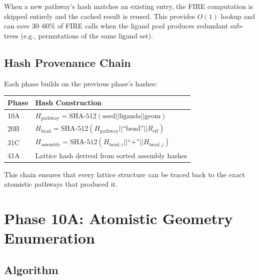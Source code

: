 \documentclass[11pt,a4paper]{article}
\begin{document}
When a new pathway's hash matches an existing entry, the FIRE
computation is skipped entirely and the cached result is reused.
This provides $O(1)$ lookup and can save 30--60\% of FIRE calls
when the ligand pool produces redundant sub-trees (e.g., permutations
of the same ligand set).

\subsection{Hash Provenance Chain}

Each phase builds on the previous phase's hashes:

\begin{center}
\begin{tabular}{lp{9cm}}
\toprule
\textbf{Phase} & \textbf{Hash Construction} \\
\midrule
10A & $H_\text{pathway} = \text{SHA-512}(\text{seed} || \text{ligands} || \text{geom})$ \\
20B & $H_\text{bead} = \text{SHA-512}(H_\text{pathway} || \text{``bead''} || R_\text{eff})$ \\
31C & $H_\text{assembly} = \text{SHA-512}(H_{\text{bead},i} || \text{``+''} || H_{\text{bead},j})$ \\
41A & Lattice hash derived from sorted assembly hashes \\
\bottomrule
\end{tabular}
\end{center}

\noindent This chain ensures that every lattice structure can be traced
back to the exact atomistic pathways that produced it.

\section{Phase 10A: Atomistic Geometry Enumeration}
\label{sec:phase10A}

\subsection{Algorithm}
\end{document}
